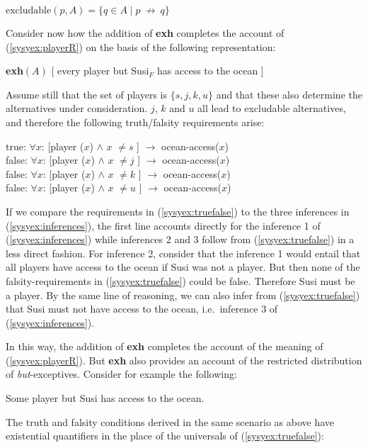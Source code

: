 \documentclass[output=paper,colorlinks,citecolor=brown,
]{langscibook}
\def\refp#1{(\ref{sy#1})}
\begin{document}
\ea \label{syexcludable}
$\text{excludable}(p,A) = \{q \in A \mid p\  \not\rightarrow\ q\}$\z


Consider now how the addition of \textbf{exh} completes the account of \refp{syex:playerR} on the basis of the following representation:

\ea \label{syex:playerLF}
     \textbf{exh}$(A)$ [ every player but Susi$_F$ has access to the ocean ]\z

Assume still that the set of players is $\{s, j, k, u\}$ and that these also determine the alternatives under consideration.
$j$, $k$ and $u$ all lead to excludable alternatives, and therefore the following truth/falsity requirements arise:

\ea \label{syex:truefalse}
    true: $\forall x$: [player ($x$) $\land$ $x$ $\neq s$ ] $\rightarrow$ ocean-access($x$)\\
    false: $\forall x$: [player ($x$) $\land$ $x$ $\neq j$ ] $\rightarrow$ ocean-access($x$)\\
	  false: $\forall x$: [player ($x$) $\land$ $x$ $\neq k$ ] $\rightarrow$ ocean-access($x$)\\
    false: $\forall x$: [player ($x$) $\land$ $x$ $\neq u$ ] $\rightarrow$ ocean-access($x$)\z

If we compare the requirements in \refp{syex:truefalse} to the three inferences in \refp{syex:inferences}, the first line accounts directly for the inference 1 of \refp{syex:inferences} while inferences 2 and 3  follow from \refp{syex:truefalse} in a less direct fashion.
For inference 2, consider that the inference 1 would entail that all players have access to the ocean if Susi was not a player.
But then none of the falsity-requirements in \refp{syex:truefalse} could be false. Therefore Susi must be a player.
By the same line of reasoning, we can also infer from \refp{syex:truefalse} that Susi must not have access to the ocean, i.e.\ inference 3 of \refp{syex:inferences}.

In this way, the addition of \textbf{exh} completes the account of the meaning of \refp{syex:playerR}.  
But \textbf{exh} also provides an account of the restricted distribution of \emph{but}-exceptives. Consider for example the following:

\ea *Some player but Susi has access to the ocean.\z

The truth and falsity conditions derived in the same scenario as above have existential quantifiers in the place of the universals of \refp{syex:truefalse}:
\end{document}
